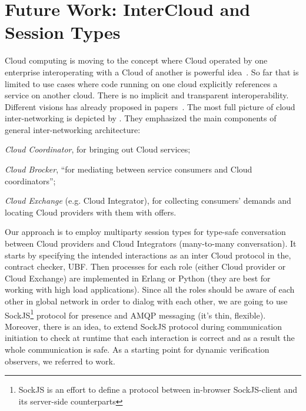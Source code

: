 \documentclass[10pt]{llncs}
\begin{document}


\section{Future Work: InterCloud and Session Types}
\label{sect:highlights}
Cloud computing is moving to the concept where Cloud operated by one enterprise interoperating with a Cloud of another is powerful idea~\cite{Buyya2009}.
So far that is limited to use cases where code running on one cloud explicitly references a service on another cloud. There is no implicit and transparent interoperability. 
Different visions has already proposed in papers~\cite{utility-driven-fed,xmpp-intercloud-transport,cloud-integrator}. The most full picture of cloud inter-networking is depicted by \cite{utility-driven-fed}. They emphasized the main components of general inter-networking architecture:
\begin{inparaenum}
\item \textit{Cloud Coordinator}, for bringing out Cloud services;
\item \textit{Cloud Brocker}, ``for mediating between service consumers and Cloud coordinators'';
\item \textit{Cloud Exchange} (e.g. Cloud Integrator), for collecting consumers' demands and locating Cloud providers with them with offers.
\end{inparaenum}

Our approach is to employ multiparty session types \cite{ng2012multiparty} for type-safe conversation between Cloud providers and Cloud Integrators (many-to-many conversation). It starts by specifying the intended interactions as an inter Cloud protocol in the, contract checker, UBF. Then processes for each role (either Cloud provider or Cloud Exchange) are implemented in Erlang or Python (they are best for working with high load applications). Since all the roles should be aware of each other in global network in order to dialog with each other, we are going to use SockJS\footnote{SockJS is an effort to define a protocol between in-browser SockJS-client and its server-side counterparts} protocol for presence and AMQP messaging (it's thin, flexible). Moreover, there is an idea, to extend SockJS protocol during communication initiation to check at runtime that each interaction is correct and as a result the whole communication is safe. As a starting point for dynamic verification observers, we referred to \cite{safe-conver-prog-python} work.
\end{document}
